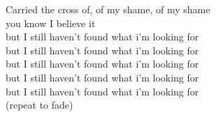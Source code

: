 Carried the cross of, of my shame, of my  shame\\
you know I believe it\\
but I  still haven't  found what i'm  looking for\\
but I  still haven't  found what i'm  looking for\\
but I  still haven't  found what i'm  looking for\\
but I  still haven't  found what i'm  looking for\\
but I  still haven't  found what i'm  looking for\\
(repeat to fade)
